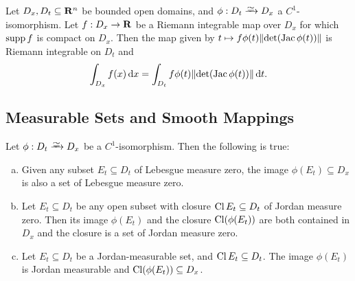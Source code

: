 \begin{theorem}
\label{thm:change-variables}
Let \(D_x, D_t \subseteq \mathbf{R}^n\) be bounded open domains, and \(\phi: D_t \isoto
D_x\) a \(C^1\)-isomorphism. Let \(f: D_x \to \mathbf{R}\) be a Riemann integrable map
over \(D_x\) for which \(\operatorname{supp} f\) is compact on \(D_x\). Then the map given by
\(t \mapsto f \phi(t) \lVert\det(\operatorname{Jac} \phi(t))\rVert\) is Riemann integrable on
\(D_t\) and
\[
  \int_{D_x} f(x)\, \mathrm{d} x
  = \int_{D_t} f \phi(t) \lVert\det(\operatorname{Jac} \phi(t))\rVert\, \mathrm{d} t.
\]
\end{theorem}

\subsection{Measurable Sets and Smooth Mappings}

\begin{lemma}
\label{lem:C1-isomorphisms-preserve-measure-properties}
Let \(\phi: D_t \isoto D_x\) be a \(C^1\)-isomorphism. Then the following is
true:
\begin{enumerate}[(a)]\setlength\itemsep{0em}
\item Given any subset \(E_t \subseteq D_t\) of Lebesgue measure zero, the image
  \(\phi(E_t) \subseteq D_x\) is also a set of Lebesgue measure zero.

\item Let \(E_t \subseteq D_t\) be any open subset with closure \(\operatorname{Cl} E_t
  \subseteq D_t\) of Jordan measure zero. Then its image \(\phi(E_t)\) and the
  closure \(\operatorname{Cl}(\phi(E_t))\) are both contained in \(D_x\) and the closure
  is a set of Jordan measure zero.

\item Let \(E_t \subseteq D_t\) be a Jordan-measurable set, and \(\operatorname{Cl} E_t
  \subseteq D_t\). The image \(\phi(E_t)\) is Jordan measurable and
  \(\operatorname{Cl}(\phi(E_t)) \subseteq D_x\).
\end{enumerate}
\end{lemma}

